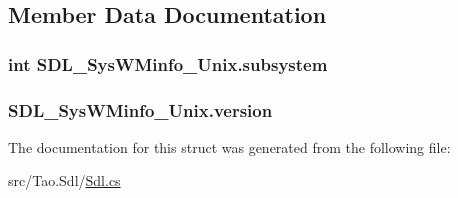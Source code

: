 \subsection{Member Data Documentation}
\hypertarget{struct_s_d_l___sys_w_minfo___unix_a71a729f014bd9247f4a8bc2f429745f3}{
\subsubsection[{subsystem}]{\setlength{\rightskip}{0pt plus 5cm}int {\bf SDL\_\-SysWMinfo\_\-Unix.subsystem}}}
\label{struct_s_d_l___sys_w_minfo___unix_a71a729f014bd9247f4a8bc2f429745f3}
\hypertarget{struct_s_d_l___sys_w_minfo___unix_a916172fa6da739f2732e9d7b96448492}{
\subsubsection[{version}]{ {\bf SDL\_\-SysWMinfo\_\-Unix.version}}}
\label{struct_s_d_l___sys_w_minfo___unix_a916172fa6da739f2732e9d7b96448492}


The documentation for this struct was generated from the following file:\begin{DoxyCompactItemize}
\item 
src/Tao.Sdl/\hyperlink{_sdl_8cs}{Sdl.cs}\end{DoxyCompactItemize}
